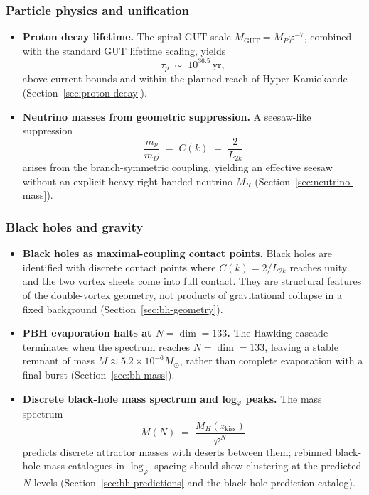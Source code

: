 \subsubsection*{Particle physics and unification}

\begin{itemize}[nosep,leftmargin=*]
\item \textbf{Proton decay lifetime.}
  The spiral GUT scale $M_{\mathrm{GUT}} = M_P\varphi^{-7}$, combined with the
  standard GUT lifetime scaling, yields
  \[
    \tau_p \;\sim\; 10^{36.5}\,\mathrm{yr},
  \]
  above current bounds and within the planned reach of Hyper-Kamiokande
  (Section~\ref{sec:proton-decay}).

\item \textbf{Neutrino masses from geometric suppression.}
  A seesaw-like suppression
  \[
    \frac{m_\nu}{m_D} \;=\; C(k) \;=\; \frac{2}{L_{2k}}
  \]
  arises from the branch-symmetric coupling, yielding an effective seesaw
  without an explicit heavy right-handed neutrino $M_R$
  (Section~\ref{sec:neutrino-mass}).
\end{itemize}

\subsubsection*{Black holes and gravity}

\begin{itemize}[nosep,leftmargin=*]
\item \textbf{Black holes as maximal-coupling contact points.}
  Black holes are identified with discrete contact points where
  $C(k)=2/L_{2k}$ reaches unity and the two vortex sheets come into full
  contact.  They are structural features of the double-vortex geometry,
  not products of gravitational collapse in a fixed background
  (Section~\ref{sec:bh-geometry}).

\item \textbf{PBH evaporation halts at $N = \dim = 133$.}
  The Hawking cascade terminates when the spectrum reaches $N = \dim = 133$,
  leaving a stable remnant of mass $M \approx 5.2\times 10^{-6}M_\odot$,
  rather than complete evaporation with a final burst
  (Section~\ref{sec:bh-mass}).

\item \textbf{Discrete black-hole mass spectrum and log$_\varphi$ peaks.}
  The mass spectrum
  \[
    M(N) \;=\; \frac{M_H(z_{\mathrm{kiss}})}{\varphi^N}
  \]
  predicts discrete attractor masses with deserts between them; rebinned
  black-hole mass catalogues in $\log_\varphi$ spacing should show clustering
  at the predicted $N$-levels (Section~\ref{sec:bh-predictions} and
  the black-hole prediction catalog).
\end{itemize}

